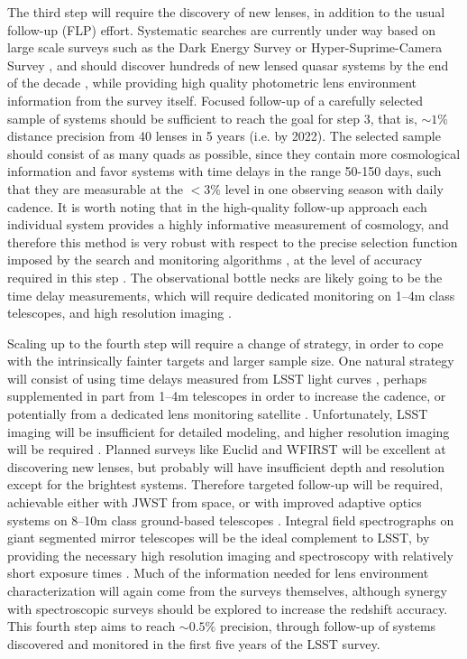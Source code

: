 The third step will require the discovery of new lenses, in addition
to the usual follow-up (FLP) effort. Systematic searches are currently
under way based on large scale surveys such as the Dark Energy Survey
or Hyper-Suprime-Camera Survey \citep{Agn++15,Mor++16}, and should
discover hundreds of new lensed quasar systems by the end of the
decade \citep{O+M10}, while providing high quality photometric lens
environment information from the survey itself.  Focused follow-up of
a carefully selected sample of systems should be sufficient to reach
the goal for step 3, that is, $\sim1\%$ distance precision from 40
lenses in 5 years (i.e. by 2022). The selected sample should consist
of as many quads as possible, since they contain more cosmological
information and favor systems with time delays in the range 50-150
days, such that they are measurable at the $<3\%$ level in one
observing season with daily cadence. It is worth noting that in the
high-quality follow-up approach each individual system provides a
highly informative measurement of cosmology, and therefore this method
is very robust with respect to the precise selection function imposed
by the search and monitoring algorithms \citep{C+C16}, at the level of
accuracy required in this step . The observational bottle necks are
likely going to be the time delay measurements, which will require
dedicated monitoring on 1--4m class telescopes, and high resolution
imaging \citep{Tre++13}.

Scaling up to the fourth step will require a change of strategy, in
order to cope with the intrinsically fainter targets and larger sample
size. One natural strategy will consist of using time delays measured
from LSST light curves \citep{LiaoEtal2015}, perhaps supplemented in
part from 1--4m telescopes in order to increase the cadence, or potentially
from a dedicated lens monitoring satellite
\citep{Mou++08}. Unfortunately, LSST imaging will be insufficient for
detailed modeling, and higher resolution imaging will be required
\citep{Men++15}.
Planned surveys like Euclid and WFIRST will be excellent at
discovering new lenses, but probably will have insufficient depth and
resolution except for the brightest systems. Therefore targeted
follow-up will be required, achievable either with JWST from space, or
with improved adaptive optics systems on 8--10m class ground-based
telescopes \citep{Mar++07,Che++16,Rus++16}. Integral field
spectrographs on giant segmented mirror telescopes will be the ideal
complement to LSST, by providing the necessary high resolution imaging
and spectroscopy with relatively short exposure times
\citep[e.g.][]{Ski++15}.
Much of the information needed for lens environment characterization will again
come from the surveys themselves, although synergy with spectroscopic
surveys should be explored to increase the redshift accuracy.
This fourth step
aims to reach $\sim0.5\%$ precision, through follow-up of systems discovered
and monitored in the first five years of the LSST survey.

